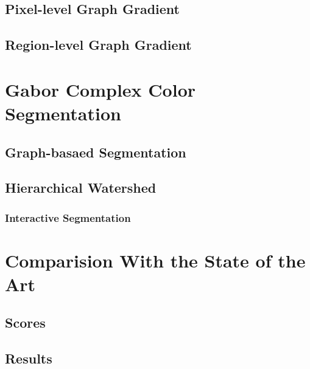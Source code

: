 \documentclass[journal]{IEEEtran}
\begin{document}
\subsection{Pixel-level Graph Gradient}
\subsection{Region-level Graph Gradient}

\section{Gabor Complex Color Segmentation}
\subsection{Graph-basaed Segmentation}
\subsection{Hierarchical Watershed}
\subsubsection{Interactive Segmentation}

\section{Comparision With the State of the Art}
\subsection{Scores}
\subsection{Results}

%
%


%
%
\end{document}
